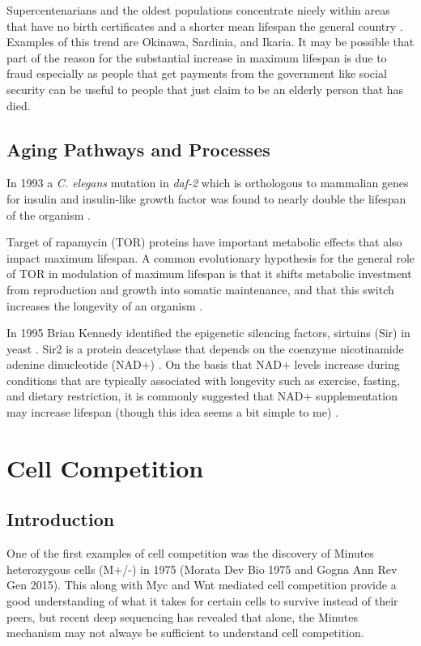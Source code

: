 \documentclass[]{book}
\begin{document}
Supercentenarians and the oldest populations concentrate nicely within
areas that have no birth certificates and a shorter mean lifespan the
general country \citep{Newman2019-zs}. Examples of this trend are
Okinawa, Sardinia, and Ikaria. It may be possible that part of the
reason for the substantial increase in maximum lifespan is due to fraud
especially as people that get payments from the government like social
security can be useful to people that just claim to be an elderly person
that has died.

\section{Aging Pathways and
Processes}\label{aging-pathways-and-processes}

In 1993 a \emph{C. elegans} mutation in \emph{daf-2} which is
orthologous to mammalian genes for insulin and insulin-like growth
factor was found to nearly double the lifespan of the organism
\citep{kenyon1993c}.

Target of rapamycin (TOR) proteins have important metabolic effects that
also impact maximum lifespan. A common evolutionary hypothesis for the
general role of TOR in modulation of maximum lifespan is that it shifts
metabolic investment from reproduction and growth into somatic
maintenance, and that this switch increases the longevity of an organism
\citep{kapahi2010tor}.

In 1995 Brian Kennedy identified the epigenetic silencing factors,
sirtuins (Sir) in yeast \citep{kennedy1995mutation}. Sir2 is a protein
deacetylase that depends on the coenzyme nicotinamide adenine
dinucleotide (NAD+) \citep{imai2000transcriptional}. On the basis that
NAD+ levels increase during conditions that are typically associated
with longevity such as exercise, fasting, and dietary restriction, it is
commonly suggested that NAD+ supplementation may increase lifespan
(though this idea seems a bit simple to me) \citep{mouchiroud2013nad}.

\chapter{Cell Competition}\label{competition}

\section{Introduction}\label{introduction-3}

One of the first examples of cell competition was the discovery of
Minutes heterozygous cells (M+/-) in 1975 (Morata Dev Bio 1975 and Gogna
Ann Rev Gen 2015). This along with Myc and Wnt mediated cell competition
provide a good understanding of what it takes for certain cells to
survive instead of their peers, but recent deep sequencing has revealed
that alone, the Minutes mechanism may not always be sufficient to
understand cell competition.
\end{document}
